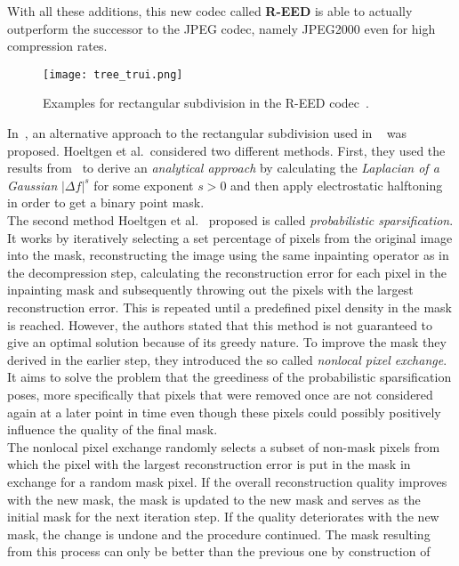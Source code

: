 With all these additions, this new codec called \textbf{R-EED} is able to actually outperform the
successor to the JPEG codec, namely JPEG2000 even for high compression rates.
\begin{figure}[H]
    \centering
    \texttt{[image: tree\_trui.png]}
    \caption{Examples for rectangular subdivision in the R-EED codec~\cite{schmaltz09}.}
\end{figure}
\noindent In~\cite{hoeltgen12}, an alternative approach to the rectangular subdivision used in
~\cite{schmaltz09} was proposed. Hoeltgen et al.\ considered two different methods. First, they used the results
from~\cite{belhachmi09} to derive an \textit{analytical approach} by calculating the \textit{Laplacian of a
Gaussian} $\vert \Delta f \vert^s$ for some exponent $s>0$ and then apply electrostatic 
halftoning~\cite{electrostatic} in order to get a binary point mask.\\
The second method Hoeltgen et al.~\cite{hoeltgen12} proposed is called \textit{probabilistic sparsification}. It works by
iteratively selecting a set percentage of pixels from the original image into the mask,
reconstructing the image using the same inpainting operator as in the decompression step, 
calculating the reconstruction error for each pixel in the inpainting mask and subsequently throwing out
the pixels with the largest reconstruction error. This is repeated until a predefined pixel
density in the mask is reached. However, the authors stated that this method is not guaranteed to
give an optimal solution because of its greedy nature. To improve the mask they derived in the
earlier step, they introduced the so called \textit{nonlocal pixel exchange}. It aims to solve the
problem that the greediness of the probabilistic sparsification poses, more specifically that
pixels that were removed once are not considered again at a later point in time even though these
pixels could possibly positively influence the quality of the final mask.\\
The nonlocal pixel exchange randomly selects a subset of non-mask pixels from which the pixel with
the largest reconstruction error is put in the mask in exchange for a random mask pixel.
If the overall reconstruction quality improves with the new mask, the mask is updated to the new
mask and serves as the initial mask for the next iteration step. If the quality deteriorates with
the new mask, the change is undone and the procedure continued.
The mask resulting from this process can only be better than the previous one by construction of
